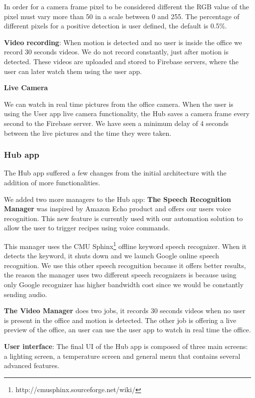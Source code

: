 \documentclass[conference]{IEEEtran}
\begin{document}
In order for a camera frame pixel to be considered different the RGB value of the pixel must vary more than 50 in a scale between 0 and 255. The percentage of different pixels for a positive detection is user defined, the default is 0.5\%.


\textbf{Video recording}: When motion is detected and no user is inside the office we record 30 seconds videos. We do not record constantly, just after motion is detected. These videos are uploaded and stored to Firebase servers, where the user can later watch them using the user app.

\textbf{Live Camera}

We can watch in real time pictures from the office camera. When the user is using the User app live camera functionality, the Hub saves a camera frame every second to the Firebase server. We have seen a minimum delay of 4 seconds between the live pictures and the time they were taken.



\subsubsection{Hub app}

The Hub app suffered a few changes from the initial architecture with the addition of more functionalities.

We added two more managers to the Hub app: 
\textbf{The Speech Recognition Manager} was inspired by Amazon Echo product and offers our users voice recognition. This new feature is currently used with our automation solution to allow the user to trigger recipes using voice commands. 

This manager uses the CMU Sphinx\footnote{http://cmusphinx.sourceforge.net/wiki/} offline keyword speech recognizer. When it detects the keyword, it shuts down and we launch Google online speech recognition. We use this other speech recognition because it offers better results, the reason the manager uses two different speech recognizers is because using only Google recognizer has higher bandwidth cost since we would be constantly sending audio. 

\textbf{The Video Manager} does two jobs, it records 30 seconds videos when no user is present in the office and motion is detected. The other job is offering a live preview of the office, an user can use the user app to watch in real time the office.



\textbf{User interface}: The final \ac{UI} of the Hub app is composed of three main screens: a lighting screen, a temperature screen and general menu that contains several advanced features.
\end{document}

